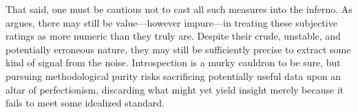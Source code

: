 That said, one must be cautious not to cast all such measures into the inferno. As \textcite{Labovitz1967} argues, there may still be value—however impure—in treating these subjective ratings as more numeric than they truly are. Despite their crude, unstable, and potentially erroneous nature, they may still be sufficiently precise to extract some kind of signal from the noise. Introspection is a murky cauldron to be sure, but pursuing methodological purity risks sacrificing potentially useful data upon an altar of perfectionism, discarding what might yet yield insight merely because it fails to meet some idealized standard.








